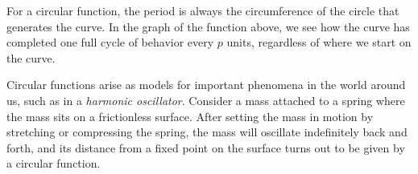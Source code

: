 \documentclass[nooutcomes, noauthor]{ximera}
\begin{document}
For a circular function, the period is always the circumference of the circle that generates the curve.  In the graph of the function above, we see how the curve has completed one full cycle of behavior every \(p\) units, regardless of where we start on the curve.%

Circular functions arise as models for important phenomena in the world around us, such as in a \emph{harmonic oscillator}.   Consider a mass attached to a spring where the mass sits on a frictionless surface.  After setting the mass in motion by stretching or compressing the spring, the mass will oscillate indefinitely back and forth, and its distance from a fixed point on the surface turns out to be given by a circular function.%

%
\end{document}
